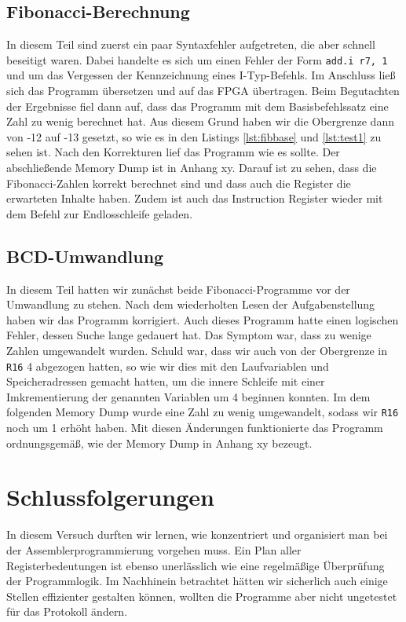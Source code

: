 \documentclass[12pt,a4paper]{scrartcl}
\begin{document}
\subsection*{Fibonacci-Berechnung}
In diesem Teil sind zuerst ein paar Syntaxfehler aufgetreten, die aber schnell beseitigt waren.
Dabei handelte es sich um einen Fehler der Form \texttt{add.i r7, 1} und um das Vergessen der Kennzeichnung eines I-Typ-Befehls.
Im Anschluss lie\ss{} sich das Programm \"ubersetzen und auf das FPGA \"ubertragen.
Beim Begutachten der Ergebnisse fiel dann auf, dass das Programm mit dem Basisbefehlssatz eine Zahl zu wenig berechnet hat.
Aus diesem Grund haben wir die Obergrenze dann von -12 auf -13 gesetzt, so wie es in den Listings \ref{lst:fibbase} und \ref{lst:test1} zu sehen ist.
Nach den Korrekturen lief das Programm wie es sollte.
Der abschlie\ss{}ende Memory Dump ist in Anhang xy.
Darauf ist zu sehen, dass die Fibonacci-Zahlen korrekt berechnet sind und dass auch die Register die erwarteten Inhalte haben.
Zudem ist auch das Instruction Register wieder mit dem Befehl zur Endlosschleife geladen.

\subsection*{BCD-Umwandlung}
In diesem Teil hatten wir zun\"achst beide Fibonacci-Programme vor der Umwandlung zu stehen.
Nach dem wiederholten Lesen der Aufgabenstellung haben wir das Programm korrigiert.
Auch dieses Programm hatte einen logischen Fehler, dessen Suche lange gedauert hat.
Das Symptom war, dass zu wenige Zahlen umgewandelt wurden.
Schuld war, dass wir auch von der Obergrenze in \texttt{R16} 4 abgezogen hatten, so wie wir dies mit den Laufvariablen und Speicheradressen gemacht hatten, um die innere Schleife mit einer Imkrementierung der genannten Variablen um 4 beginnen konnten.
Im dem folgenden Memory Dump wurde eine Zahl zu wenig umgewandelt, sodass wir \texttt{R16} noch um 1 erh\"oht haben.
Mit diesen \"Anderungen funktionierte das Programm ordnungsgem\"a\ss{}, wie der Memory Dump in Anhang xy bezeugt.

\section{Schlussfolgerungen}
In diesem Versuch durften wir lernen, wie konzentriert und organisiert man bei der Assemblerprogrammierung vorgehen muss.
Ein Plan aller Registerbedeutungen ist ebenso unerl\"asslich wie eine regelm\"a\ss{}ige \"Uberpr\"ufung der Programmlogik.
Im Nachhinein betrachtet h\"atten wir sicherlich auch einige Stellen effizienter gestalten k\"onnen, wollten die Programme aber nicht ungetestet f\"ur das Protokoll \"andern.
\end{document}
